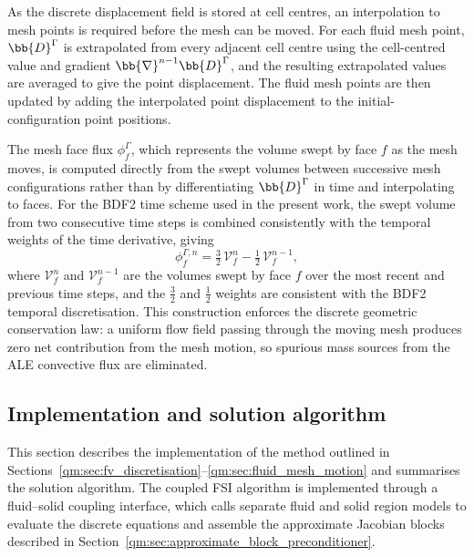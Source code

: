 As the discrete displacement field is stored at cell centres, an interpolation to mesh points is required before the mesh can be moved.
For each fluid mesh point, $\bb{D}^{\Gamma}$ is extrapolated from every adjacent cell centre using the cell-centred value and gradient $\bb{\nabla}^{n-1} \bb{D}^{\Gamma}$, and the resulting extrapolated values are averaged to give the point displacement.
The fluid mesh points are then updated by adding the interpolated point displacement to the initial-configuration point positions.

The mesh face flux $\phi^{\Gamma}_f$, which represents the volume swept by face $f$ as the mesh moves, is computed directly from the swept volumes between successive mesh configurations rather than by differentiating $\bb{D}^{\Gamma}$ in time and interpolating to faces.
For the BDF2 time scheme used in the present work, the swept volume from two consecutive time steps is combined consistently with the temporal weights of the time derivative, giving
\begin{equation}
\phi^{\Gamma,n}_f
=
\tfrac{3}{2} \, \mathcal{V}^{n}_{f}
-
\tfrac{1}{2} \, \mathcal{V}^{n-1}_{f},
    \label{qm:eqn:gcl_swept_volume}
\end{equation}
where $\mathcal{V}^{n}_{f}$ and $\mathcal{V}^{n-1}_{f}$ are the volumes swept by face $f$ over the most recent and previous time steps, and the $\tfrac{3}{2}$ and $\tfrac{1}{2}$ weights are consistent with the BDF2 temporal discretisation.
This construction enforces the discrete geometric conservation law: a uniform flow field passing through the moving mesh produces zero net contribution from the mesh motion, so spurious mass sources from the ALE convective flux are eliminated.


\subsection{Implementation and solution algorithm}
\label{qm:sec:implementation_details}

This section describes the implementation of the method outlined in Sections~\ref{qm:sec:fv_discretisation}--\ref{qm:sec:fluid_mesh_motion} and summarises the solution algorithm. The coupled FSI algorithm is implemented through a fluid--solid coupling interface, which calls separate fluid and solid region models to evaluate the discrete equations and assemble the approximate Jacobian blocks described in Section~\ref{qm:sec:approximate_block_preconditioner}.

